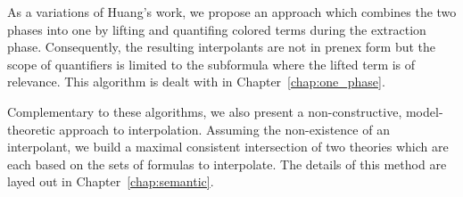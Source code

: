 

As a variations of Huang's work, we propose an approach which combines the two phases into one 
by lifting and quantifing colored terms during the extraction phase. 
Consequently, the resulting interpolants are not in prenex form but the scope of quantifiers is limited to the subformula where the lifted term is of relevance.
This algorithm is dealt with in Chapter~\ref{chap:one_phase}.

Complementary to these algorithms, we also present a non-constructive, model-theoretic approach to interpolation.
Assuming the non-existence of an interpolant, we build a maximal consistent intersection of two theories which are each based on the sets of formulas to interpolate. The details of this method are layed out in Chapter~\ref{chap:semantic}.



